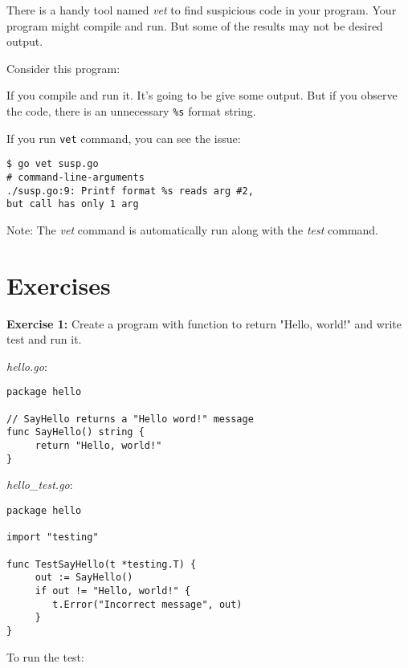 There is a handy tool named \textit{vet} to find
suspicious code in your program.  Your program might compile and
run. But some of the results may not be desired output.

Consider this program:



If you compile and run it.  It's going to be give some output.  But if
you observe the code, there is an unnecessary \texttt{\%s} format
string.

If you run \texttt{vet} command, you can see the issue:


\begin{lstlisting}[numbers=none]
$ go vet susp.go
# command-line-arguments
./susp.go:9: Printf format %s reads arg #2,
but call has only 1 arg
\end{lstlisting}

Note: The \textit{vet} command is automatically run along with
the \textit{test} command.

\section{Exercises}

\textbf{Exercise 1:} Create a program with function to return "Hello, world!" and
write test and run it.

\textit{hello.go}:

\begin{lstlisting}[numbers=none]
package hello

// SayHello returns a "Hello word!" message
func SayHello() string {
     return "Hello, world!"
}
\end{lstlisting}

\textit{hello\_test.go}:

\begin{lstlisting}[numbers=none]
package hello

import "testing"

func TestSayHello(t *testing.T) {
     out := SayHello()
     if out != "Hello, world!" {
        t.Error("Incorrect message", out)
     }
}
\end{lstlisting}

To run the test:

